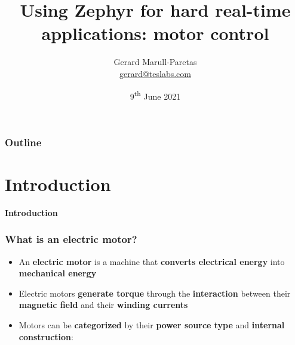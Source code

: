 \documentclass[handout]{beamer}
\title{Using Zephyr for hard real-time applications: motor control}
\author{
  \texorpdfstring{
    Gerard Marull-Paretas\\
    \href{mailto:gerard@teslabs.com}{gerard@teslabs.com}
  }{Gerard Marull-Paretas}
}
\date{9\textsuperscript{th} June 2021}
\begin{document}

\begin{frame}
  \thispagestyle{empty}
  \titlepage{}
\end{frame}

\begin{frame}
  \frametitle{Outline}
  \tableofcontents
\end{frame}


\section{Introduction}

\begin{frame}[plain]{}
  \begin{center}
    \Huge \textbf{Introduction}
  \end{center}
\end{frame}

\begin{frame}
  \frametitle{What is an electric motor?}

  \begin{itemize}
    \item<1-> An \textbf{electric motor} is a machine that \textbf{converts
            electrical energy} into \textbf{mechanical energy}
    \item<2-> Electric motors \textbf{generate torque} through the
          \textbf{interaction} between their \textbf{magnetic field} and their
          \textbf{winding currents}
    \item<3-> Motors can be \textbf{categorized} by their \textbf{power source
            type} and \textbf{internal construction}:
  \end{itemize}

  \begin{center}
  \end{center}
\end{frame}
\end{document}
